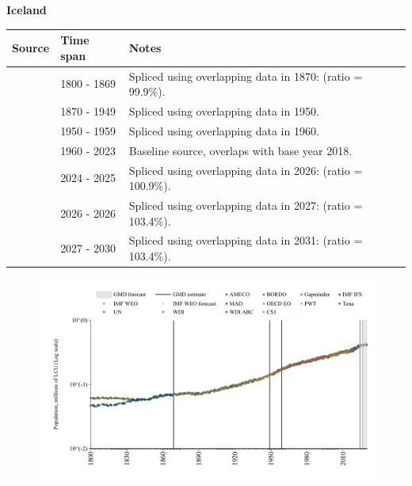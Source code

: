\documentclass[12pt,a4paper,landscape]{article}
\begin{document}
\begin{adjustbox}{max totalsize={\paperwidth}{\paperheight},center}
\begin{minipage}[t][\textheight][t]{\textwidth}
\vspace*{0.5cm}
{}
\begin{center}
{\Large\bfseries Iceland}
\end{center}
\vspace{0.5cm}
\begin{table}[H]
\centering
\small
\begin{tabular}{|l|l|l|}
\hline
\textbf{Source} & \textbf{Time span} & \textbf{Notes} \\
\hline
\rowcolor{white}\cite{Gapminder}& 1800 - 1869 &Spliced using overlapping data in 1870: (ratio = 99.9\%).\\
\rowcolor{lightgray}\cite{CS1_ISL}& 1870 - 1949 &Spliced using overlapping data in 1950.\\
\rowcolor{white}\cite{IMF_IFS}& 1950 - 1959 &Spliced using overlapping data in 1960.\\
\rowcolor{lightgray}\cite{WDI}& 1960 - 2023 &Baseline source, overlaps with base year 2018.\\
\rowcolor{white}\cite{OECD_EO}& 2024 - 2025 &Spliced using overlapping data in 2026: (ratio = 100.9\%).\\
\rowcolor{lightgray}\cite{AMECO}& 2026 - 2026 &Spliced using overlapping data in 2027: (ratio = 103.4\%).\\
\rowcolor{white}\cite{Gapminder}& 2027 - 2030 &Spliced using overlapping data in 2031: (ratio = 103.4\%).\\
\hline
\end{tabular}
\end{table}
\begin{figure}[H]
\centering
\includegraphics[width=\textwidth,height=0.6\textheight,keepaspectratio]{graphs/ISL_pop.pdf}
\end{figure}
\end{minipage}
\end{adjustbox}
\end{document}

